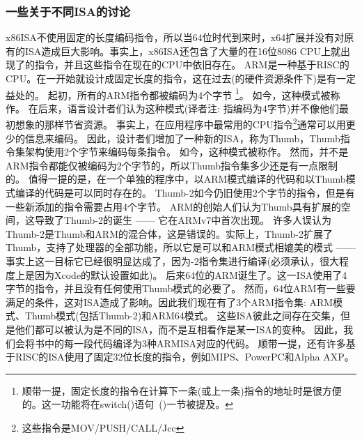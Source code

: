 %
%
%

\subsubsection{一些关于不同\ac{ISA}的讨论}
x86\ac{ISA}不使用固定的长度编码指令，所以当64位时代到来时，x64扩展并没有对原有的\ac{ISA}造成巨大影响。事实上，x86\ac{ISA}还包含了大量的在16位8086 CPU上就出现了的指令，并且这些指令在现在的CPU中依旧存在。
ARM是一种基于\ac{RISC}的\ac{CPU}。在一开始就设计成固定长度的指令，这在过去(的硬件资源条件下)是有一定益处的。
起初，所有的ARM指令都被编码为4个字节%
\footnote{
顺带一提，固定长度的指令在计算下一条(或上一条)指令的地址时是很方便的。这一功能将在switch()语句~()一节被提及。
}。
如今，这种模式被称作。
在后来，语言设计者们认为这种模式(译者注: 指编码为4字节)并不像他们最初想象的那样节省资源。
事实上，在应用程序中最常用的\ac{CPU}指令\footnote{这些指令是MOV/PUSH/CALL/Jcc}通常可以用更少的信息来编码。
因此，设计者们增加了一种新的\ac{ISA}，称为Thumb，Thumb指令集架构使用2个字节来编码每条指令。
如今，这种模式被称作。
然而，并不是ARM指令都能仅被编码为2个字节的，所以Thumb指令集多少还是有一点限制的。
值得一提的是，在一个单独的程序中，以ARM模式编译的代码和以Thumb模式编译的代码是可以同时存在的。
Thumb-2如今仍旧使用2个字节的指令，但是有一些新添加的指令需要占用4个字节。
ARM的创始人们认为Thumb具有扩展的空间，这导致了Thumb-2的诞生 —— 它在ARMv7中首次出现。
许多人误认为Thumb-2是Thumb和ARM的混合体，这是错误的。实际上，Thumb-2扩展了Thumb，支持了处理器的全部功能，所以它是可以和ARM模式相媲美的模式 —— 事实上这一目标它已经很明显达成了，因为-2指令集进行编译(必须承认，很大程度上是因为Xcode的默认设置如此)。
后来64位的ARM诞生了。这一\ac{ISA}使用了4字节的指令，并且没有任何使用Thumb模式的必要了。
然而，64位ARM有一些要满足的条件，这对\ac{ISA}造成了影响。因此我们现在有了3个ARM指令集: ARM模式、Thumb模式(包括Thumb-2)和ARM64模式。
这些\ac{ISA}彼此之间存在交集，但是他们都可以被认为是不同的\ac{ISA}，而不是互相看作是某一\ac{ISA}的变种。
因此，我们会将书中的每一段代码编译为3种ARM\ac{ISA}对应的代码。
%
%
%
顺带一提，还有许多基于\ac{RISC}的\ac{ISA}使用了固定32位长度的指令，例如MIPS、PowerPC和Alpha AXP。
